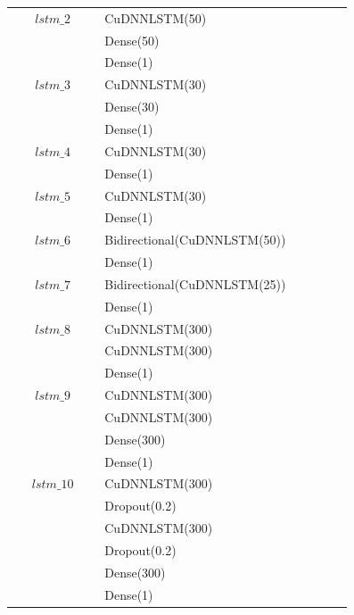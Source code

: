 \begin{longtable}{| c | m{0.58\linewidth} | r | m{0.1\linewidth} |}
    $lstm\_2$   & CuDNNLSTM(50)                 \\
                & Dense(50)                     \\
                & Dense(1)                      \\ \hline

    $lstm\_3$   & CuDNNLSTM(30)                 \\
                & Dense(30)                     \\
                & Dense(1)                      \\ \hline
    $lstm\_4$   & CuDNNLSTM(30)                 \\
                & Dense(1)                      \\ \hline
    $lstm\_5$   & CuDNNLSTM(30)                 \\
                & Dense(1)                      \\ \hline
    $lstm\_6$   & Bidirectional(CuDNNLSTM(50))  \\
                & Dense(1)                      \\ \hline
    $lstm\_7$   & Bidirectional(CuDNNLSTM(25))  \\
                & Dense(1)                      \\ \hline


    $lstm\_8$   & CuDNNLSTM(300)                \\
                & CuDNNLSTM(300)                \\
                & Dense(1)                      \\ \hline

    $lstm\_9$   & CuDNNLSTM(300)                \\
                & CuDNNLSTM(300)                \\
                & Dense(300)                    \\
                & Dense(1)                      \\ \hline

    $lstm\_10$  & CuDNNLSTM(300)                \\
                & Dropout(0.2)                  \\
                & CuDNNLSTM(300)                \\
                & Dropout(0.2)                  \\
                & Dense(300)                    \\
                & Dense(1)                      \\ \hline


\end{longtable}
